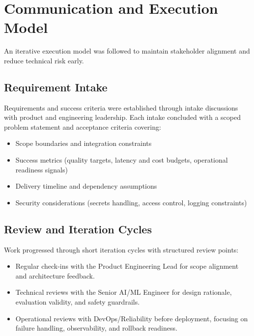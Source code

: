 

\section{Communication and Execution Model}
\label{sec:OrgProfile_Communication}

An iterative execution model was followed to maintain stakeholder alignment and reduce technical risk early.

\subsection{Requirement Intake}
\label{subsec:OrgProfile_Intake}

Requirements and success criteria were established through intake discussions with product and engineering leadership. Each intake concluded with a scoped problem statement and acceptance criteria covering:

\begin{itemize}
    \item Scope boundaries and integration constraints
    \item Success metrics (quality targets, latency and cost budgets, operational readiness signals)
    \item Delivery timeline and dependency assumptions
    \item Security considerations (secrets handling, access control, logging constraints)
\end{itemize}

\subsection{Review and Iteration Cycles}
\label{subsec:OrgProfile_Iteration}

Work progressed through short iteration cycles with structured review points:

\begin{itemize}
    \item Regular check-ins with the Product Engineering Lead for scope alignment and architecture feedback.
    \item Technical reviews with the Senior AI/ML Engineer for design rationale, evaluation validity, and safety guardrails.
    \item Operational reviews with DevOps/Reliability before deployment, focusing on failure handling, observability, and rollback readiness.
\end{itemize}

